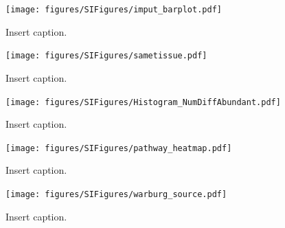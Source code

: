 \documentclass[10pt]{article}
\newcommand{\beginsupplement}{%
        \setcounter{table}{0}
        \renewcommand{\thetable}{S\arabic{table}}%
        \setcounter{figure}{0}
        \renewcommand{\thefigure}{S\arabic{figure}}%
     }
\begin{document}
\beginsupplement

\begin{figure}[ht!]
  \centering
     \texttt{[image: figures/SIFigures/imput\_barplot.pdf]}
  \caption{Insert caption.}
     \label{fig:SIFig_Imputation}
\end{figure}

\begin{figure}[ht!]
  \centering
     \texttt{[image: figures/SIFigures/sametissue.pdf]}
  \caption{Insert caption.}
     \label{fig:SIFig_SameTissue}
\end{figure}

\begin{figure}[ht!]
  \centering
     \texttt{[image: figures/SIFigures/Histogram\_NumDiffAbundant.pdf]}
  \caption{Insert caption.}
     \label{fig:SIFig_HistogramDiffAbundance}
\end{figure}
 

\begin{figure}[ht!]
  \centering
     \texttt{[image: figures/SIFigures/pathway\_heatmap.pdf]}
  \caption{Insert caption.}
     \label{fig:SIFig_PathwayHeatmap}
\end{figure}

\begin{figure}[ht!]
  \centering
     \texttt{[image: figures/SIFigures/warburg\_source.pdf]}
  \caption{Insert caption.}
     \label{fig:SIFig_WarburgSource}
\end{figure}
 
\end{document}
